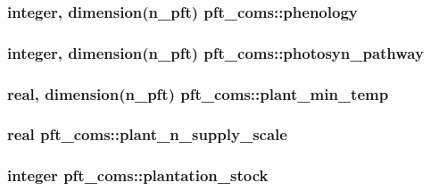 \subsubsection[{phenology}]{\setlength{\rightskip}{0pt plus 5cm}integer, dimension(n\+\_\+pft) pft\+\_\+coms\+::phenology}\label{namespacepft__coms_a5a3bbf23e4825378c0f3c8bd788c6c68}
\hypertarget{namespacepft__coms_a697c05e70b11e609bd5316b8eed821ed}{}
\subsubsection[{photosyn\+\_\+pathway}]{\setlength{\rightskip}{0pt plus 5cm}integer, dimension(n\+\_\+pft) pft\+\_\+coms\+::photosyn\+\_\+pathway}\label{namespacepft__coms_a697c05e70b11e609bd5316b8eed821ed}
\hypertarget{namespacepft__coms_ae13d0f409c782cf00abbc9f09f55a5a8}{}
\subsubsection[{plant\+\_\+min\+\_\+temp}]{\setlength{\rightskip}{0pt plus 5cm}real, dimension(n\+\_\+pft) pft\+\_\+coms\+::plant\+\_\+min\+\_\+temp}\label{namespacepft__coms_ae13d0f409c782cf00abbc9f09f55a5a8}
\hypertarget{namespacepft__coms_a519f5d42172d290ddad951a2744c5a20}{}
\subsubsection[{plant\+\_\+n\+\_\+supply\+\_\+scale}]{\setlength{\rightskip}{0pt plus 5cm}real pft\+\_\+coms\+::plant\+\_\+n\+\_\+supply\+\_\+scale}\label{namespacepft__coms_a519f5d42172d290ddad951a2744c5a20}
\hypertarget{namespacepft__coms_abade08057c8846615ec5ff4ff9d3ffa2}{}
\subsubsection[{plantation\+\_\+stock}]{\setlength{\rightskip}{0pt plus 5cm}integer pft\+\_\+coms\+::plantation\+\_\+stock}\label{namespacepft__coms_abade08057c8846615ec5ff4ff9d3ffa2}
\hypertarget{namespacepft__coms_a94feb354a8416167ef0ff2690843ebcd}{}
